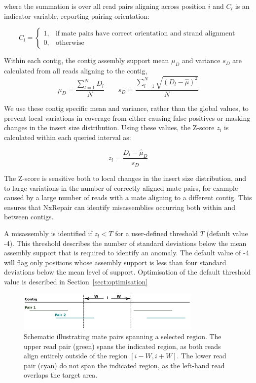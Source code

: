 where the summation is over all read pairs aligning across position $i$ and $C_l$ is an indicator variable, reporting pairing orientation:

\begin{equation}
    C_l=
    \begin{cases}
      1, & \text{if}\ \text{mate pairs have correct orientation and strand alignment} \\
      0, & \text{otherwise}
    \end{cases}
  \label{eq:C}
  \end{equation}

Within each contig, the contig assembly support mean $\mu_D$ and variance $s_D$ are calculated from all reads aligning to the contig,
\begin{equation}
\mu_D = \frac{\sum_{l=1}^N D_l}{N} \qquad s_D = \frac{\sum_{l=1}^N \sqrt{(D_l - \hat{\mu})^2}}{N}
\label{eq:contigD}
\end{equation}

We use these contig specific mean and variance, rather than the global values, to prevent local variations in coverage from either causing false positives or masking changes in the insert size distribution. Using these values,  the Z-score $z_l$ is calculated within each queried interval as: 

\begin{equation}
z_l = \frac{D_l - \hat{\mu}_D}{s_D}
\label{eq:zscore}
\end{equation}

The Z-score is sensitive both to local changes in the insert size distribution, and to large variations in the number of correctly aligned mate pairs, for example caused by a large number of reads with a mate aligning to a different contig. This ensures that NxRepair can identify misassemblies occurring both within and between contigs.  

A misassembly is identified if $z_l < T$ for a user-defined threshold $T$ (default value -4). This threshold describes the number of standard deviations below the mean assembly support that is required to identify an anomaly. The default value of -4 will flag only positions whose assembly support is less than four standard deviations below the mean level of support. Optimisation of the default threshold value is described in Section~\ref{sect:optimisation}

\begin{figure}
\centerline{\includegraphics[width=0.8\textwidth]{illumina/spanning.pdf}}
\caption{Schematic illustrating mate pairs spanning a selected region. The upper read pair (green) spans the indicated region, as both reads align entirely outside of the region $[i-W, i+W]$. The lower read pair (cyan) do not span the indicated region, as the left-hand read overlaps the target area. \label{fig:spanning}}
\end{figure}


